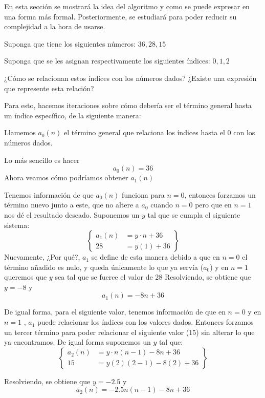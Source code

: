 
En esta sección se mostrará la idea del algoritmo y como se puede expresar en una forma más formal. Posteriormente, se estudiará para poder reducir su complejidad a la hora de usarse.

Suponga que tiene los siguientes números: $36, 28, 15$

Suponga que se les asignan respectivamente los siguientes índices: $0, 1, 2$

¿Cómo se relacionan estos índices con los números dados?
¿Existe una expresión que represente esta relación?

Para esto, hacemos iteraciones sobre cómo debería ser el término general hasta un índice específico, de la siguiente manera:

Llamemos $a_0(n)$ el término general que relaciona los índices hasta el $0$ con los números dados.

Lo más sencillo es hacer
\[a_0(n) = 36\]
Ahora veamos cómo podríamos obtener $a_1(n)$

Tenemos información de que $a_0(n)$ funciona para $n = 0$, entonces forzamos un término nuevo junto a este, que no altere a $a_0$ cuando $n=0$ pero que en $n=1$ nos dé el resultado deseado.
Suponemos un $y$ tal que se cumpla el siguiente sistema:
\begin{equation*}
    \left\{
        \begin{aligned}
            a_1(n) &= y\cdot n + 36\\
            28 &= y(1) + 36
        \end{aligned}
    \right\}
\end{equation*}
Nuevamente, ¿Por qué?, $a_1$ se define de esta manera debido a que en $n=0$ el término añadido es nulo, y queda únicamente lo que ya servía ($a_0$) y en $n=1$ queremos que $y$ sea tal que se fuerce el valor de $28$
Resolviendo, se obtiene que $y = -8$ y
\[a_1(n) = -8n + 36\]

De igual forma, para el siguiente valor, tenemos información de que en $n=0$ y en $n=1$ , $a_1$ puede relacionar los índices con los valores dados. Entonces forzamos un tercer término para poder relacionar el siguiente valor ($15$) sin alterar lo que ya encontramos. De igual forma suponemos un $y$ tal que:
\begin{equation*}
    \left\{
        \begin{aligned}
            a_2(n) &= y\cdot n(n-1) -8n + 36\\
            15 &= y (2)(2-1) - 8(2) + 36
        \end{aligned}
    \right\}
\end{equation*}

Resolviendo, se obtiene que $y = -2.5$ y
\[a_2(n) = -2.5n(n-1) - 8n + 36\]